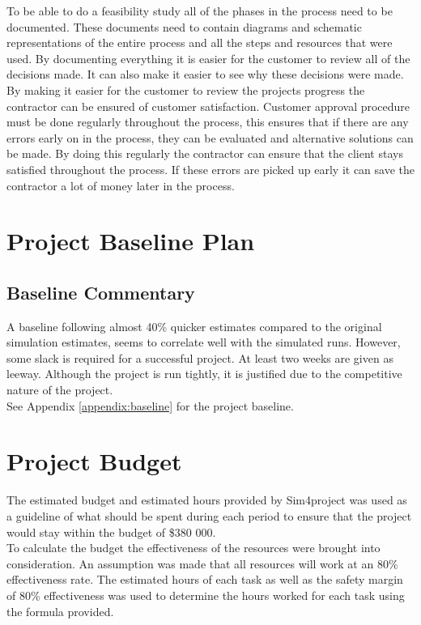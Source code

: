 \noindent
To be able to do a feasibility study all of the phases in the process need to be documented. These documents need to contain diagrams and schematic representations of the entire process and all the steps and resources that were used. By documenting everything it is easier for the customer to review all of the decisions made. It can also make it easier to see why these decisions were made. By making it easier for the customer to review the projects progress the contractor can be ensured of customer satisfaction. Customer approval procedure must be done regularly throughout the process, this ensures that if there are any errors early on in the process, they can be evaluated and alternative solutions can be made. By doing this regularly the contractor can ensure that the client stays satisfied throughout the process. If these errors are picked up early it can save the contractor a lot of money later in the process.

\newpage
\section{Project Baseline Plan}
\subsection{Baseline Commentary}

A baseline following almost 40\% quicker estimates compared to the original simulation estimates, seems to correlate well with the simulated runs. However, some slack is required for a successful project. At least two weeks are given as leeway. Although the project is run tightly, it is justified due to the competitive nature of the project.\\

\noindent
See Appendix \ref{appendix:baseline} for the project baseline.

\section{Project Budget}

The estimated budget and estimated hours provided by Sim4project was used as a guideline of what should be spent during each period to ensure that the project would stay within the budget of \$380 000.\\

\noindent
To calculate the budget the effectiveness of the resources were brought into consideration. An assumption was made that all resources will work at an 80\% effectiveness rate. The estimated hours of each task as well as the safety margin of 80\% effectiveness was used to determine the hours worked for each task using the formula provided.



